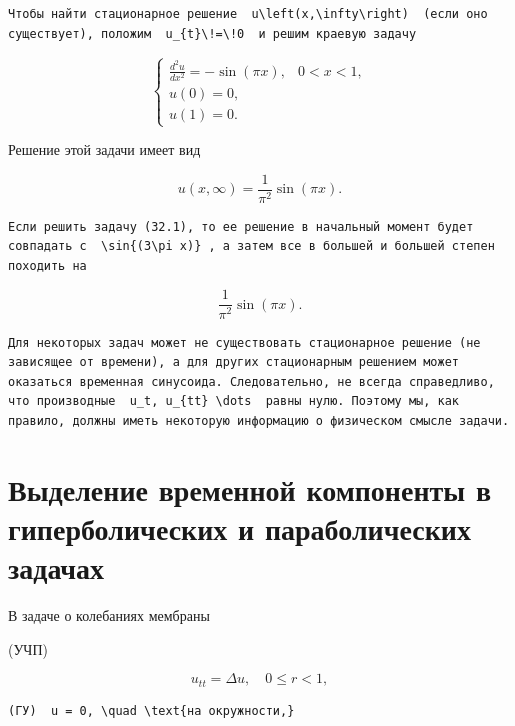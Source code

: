 \documentclass[
  ukrainian,
]{article}
\begin{document}
\begin{verbatim}
Чтобы найти стационарное решение  u\left(x,\infty\right)  (если оно существует), положим  u_{t}\!=\!0  и решим краевую задачу
\end{verbatim}

\[
\begin{cases} \frac{d^{2}u}{dx^{2}} = -\sin(\pi x), & 0 < x < 1, \\ u(0) = 0, \\ u(1) = 0. \end{cases}
\]

Решение этой задачи имеет вид

\[
u(x, \infty) = \frac{1}{\pi^2} \sin{(\pi x)}.
\]

\begin{verbatim}
Если решить задачу (32.1), то ее решение в начальный момент будет совпадать с  \sin{(3\pi x)} , а затем все в большей и большей степен походить на
\end{verbatim}

\[
\frac{1}{\pi^2}\sin{(\pi x)}.
\]

\begin{verbatim}
Для некоторых задач может не существовать стационарное решение (не зависящее от времени), а для других стационарным решением может оказаться временная синусоида. Следовательно, не всегда справедливо, что производные  u_t, u_{tt} \dots  равны нулю. Поэтому мы, как правило, должны иметь некоторую информацию о физическом смысле задачи.
\end{verbatim}

\section{Выделение временной компоненты в гиперболических и
параболических
задачах}\label{ux432ux44bux434ux435ux43bux435ux43dux438ux435-ux432ux440ux435ux43cux435ux43dux43dux43eux439-ux43aux43eux43cux43fux43eux43dux435ux43dux442ux44b-ux432-ux433ux438ux43fux435ux440ux431ux43eux43bux438ux447ux435ux441ux43aux438ux445-ux438-ux43fux430ux440ux430ux431ux43eux43bux438ux447ux435ux441ux43aux438ux445-ux437ux430ux434ux430ux447ux430ux445}

В задаче о колебаниях мембраны

(УЧП)

\[
u_{tt} = \Delta u, \quad 0 \le r < 1,
\]

\begin{verbatim}
(ГУ)  u = 0, \quad \text{на окружности,}
\end{verbatim}
\end{document}
